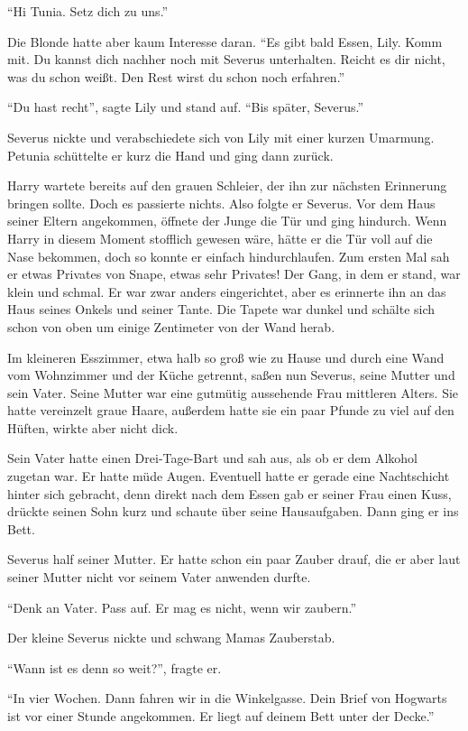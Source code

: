 \begin{traum}
\enquote{Hi Tunia. Setz dich zu uns.}

Die Blonde hatte aber kaum Interesse daran. \enquote{Es gibt bald Essen, Lily. Komm mit. Du kannst dich nachher noch mit Severus unterhalten. Reicht es dir nicht, was du schon weißt. Den Rest wirst du schon noch erfahren.}

\enquote{Du hast recht}, sagte Lily und stand auf. \enquote{Bis später, Severus.}

Severus nickte und verabschiedete sich von Lily mit einer kurzen Umarmung. Petunia schüttelte er kurz die Hand und ging dann zurück.

Harry wartete bereits auf den grauen Schleier, der ihn zur nächsten Erinnerung bringen sollte. Doch es passierte nichts. Also folgte er Severus. Vor dem Haus seiner Eltern angekommen, öffnete der Junge die Tür und ging hindurch. Wenn Harry in diesem Moment stofflich gewesen wäre, hätte er die Tür voll auf die Nase bekommen, doch so konnte er einfach hindurchlaufen. Zum ersten Mal sah er etwas Privates von Snape, etwas sehr Privates! Der Gang, in dem er stand, war klein und schmal. Er war zwar anders eingerichtet, aber es erinnerte ihn an das Haus seines Onkels und seiner Tante. Die Tapete war dunkel und schälte sich schon von oben um einige Zentimeter von der Wand herab.

Im kleineren Esszimmer, etwa halb so groß wie zu Hause und durch eine Wand vom Wohnzimmer und der Küche getrennt, saßen nun Severus, seine Mutter und sein Vater. Seine Mutter war eine gutmütig aussehende Frau mittleren Alters. Sie hatte vereinzelt graue Haare, außerdem hatte sie ein paar Pfunde zu viel auf den Hüften, wirkte aber nicht dick.

Sein Vater hatte einen Drei-Tage-Bart und sah aus, als ob er dem Alkohol zugetan war. Er hatte müde Augen. Eventuell hatte er gerade eine Nachtschicht hinter sich gebracht, denn direkt nach dem Essen gab er seiner Frau einen Kuss, drückte seinen Sohn kurz und schaute über seine Hausaufgaben. Dann ging er ins Bett.

Severus half seiner Mutter. Er hatte schon ein paar Zauber drauf, die er aber laut seiner Mutter nicht vor seinem Vater anwenden durfte.

\enquote{Denk an Vater. Pass auf. Er mag es nicht, wenn wir zaubern.}

Der kleine Severus nickte und schwang Mamas Zauberstab.

\enquote{Wann ist es denn so weit?}, fragte er.

\enquote{In vier Wochen. Dann fahren wir in die Winkelgasse. Dein Brief von Hogwarts ist vor einer Stunde angekommen. Er liegt auf deinem Bett unter der Decke.}


\end{traum}
